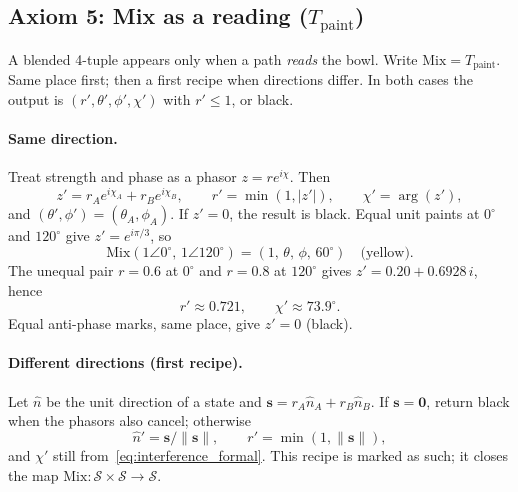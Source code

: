 \documentclass[12pt, a4paper]{article}
\begin{document}
\subsection{Axiom 5: Mix as a reading ($T_{\mathrm{paint}}$)}
\label{subsec:axiom_interference}
A blended 4-tuple appears only when a path \emph{reads} the bowl.
Write $\mathrm{Mix}=T_{\mathrm{paint}}$. Same place first; then a
first recipe when directions differ. In both cases the output is
$(r',\theta',\phi',\chi')$ with $r'\le 1$, or black.

\paragraph{Same direction.}
Treat strength and phase as a phasor $z=r e^{i\chi}$. Then
\begin{equation}
    z' = r_A e^{i\chi_A} + r_B e^{i\chi_B},
    \qquad
    r' = \min(1,|z'|),
    \qquad
    \chi' = \arg(z'),
    \label{eq:interference_formal}
\end{equation}
and $(\theta',\phi')=(\theta_A,\phi_A)$. If $z'=0$, the result is
black.
Equal unit paints at $0^\circ$ and $120^\circ$ give
$z'=e^{i\pi/3}$, so
\[
\mathrm{Mix}(1\angle 0^\circ,\,1\angle 120^\circ)
=(1,\,\theta,\,\phi,\,60^\circ)
\quad\text{(yellow)}.
\]
The unequal pair $r=0.6$ at $0^\circ$ and $r=0.8$ at $120^\circ$
gives $z'=0.20+0.6928\,i$, hence
\[
r'\approx 0.721,\qquad \chi'\approx 73.9^\circ.
\]
Equal anti-phase marks, same place, give $z'=0$ (black).

\paragraph{Different directions (first recipe).}
Let $\hat n$ be the unit direction of a state and
$\mathbf{s}=r_A\hat n_A+r_B\hat n_B$. If $\mathbf{s}=\mathbf{0}$,
return black when the phasors also cancel; otherwise
\[
\hat n'=\mathbf{s}/\|\mathbf{s}\|,\qquad
r'=\min(1,\|\mathbf{s}\|),
\]
and $\chi'$ still from~\eqref{eq:interference_formal}.
This recipe is marked as such; it closes the map
$\mathrm{Mix}:\mathcal{S}\times\mathcal{S}\to\mathcal{S}$.
\end{document}
